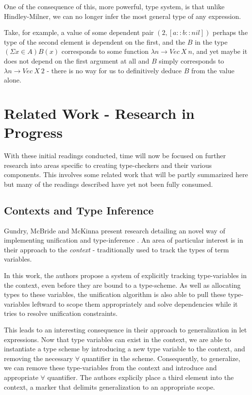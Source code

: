 \documentclass{ProgressReport}[2020/09/15]
\begin{document}
          One of the consequence of this, more powerful, type system,
          is that unlike Hindley-Milner, we can no longer infer the
          most general type of any expression.

          Take, for example, a value of some dependent pair $(2 , [a :: b
            :: nil])$ perhaps the type of the second element is
          dependent on the first, and the $B$ in the type $(
          \Sigma x \in A ) B(x)$ corresponds to some function $\lambda
          n \to Vec \: X \: n$, and yet maybe it does not depend on the first
          argument at all and $B$ simply corresponds to $\lambda n \to
          Vec \: X \: 2$ - there is no way for us to definitively
          deduce $B$ from the value alone.
  
          \section{Related Work - Research in Progress}

          With these initial readings conducted, time will now be focused on
          further research into areas specific to creating
          type-checkers and their various components. This involves
          some related work that will be partly summarized here but
          many of the readings described have yet not been fully
          consumed.

          \subsection{Contexts and Type Inference}

          Gundry, McBride and McKinna present research detailing an
          novel way of implementing unification and
          type-inference \cite{TypeInferenceInContext}. An area of
          particular interest is in their approach to the
          \emph{context} - traditionally used to track the types of
          term variables.

          In this work, the authors propose a system of explicitly
          tracking type-variables in the context, even before they are
          bound to a type-scheme. As well as allocating types
          to these variables, the unification algorithm is also
          able to pull these type-variables leftward to scope them
          appropriately and solve dependencies while it tries to
          resolve unification constraints.

          This leads to an interesting consequence in their approach to
          generalization in let expressions. Now that type variables
          can exist in the context, we are able to instantiate a type
          scheme by introducing a new type variable to the context,
          and removing the necessary $\forall$ quantifier in the
          scheme. Consequently, to generalize, we can remove these
          type-variables from the context and introduce and
          appropriate $\forall$ quantifier. The authors explicily
          place a third element into the context, a marker that delimits
          generalization to an appropriate scope.
\end{document}
